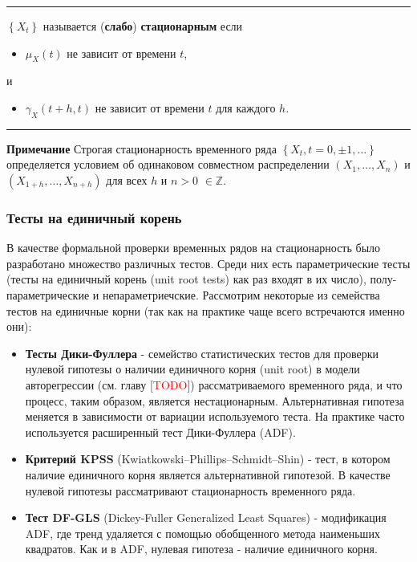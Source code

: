 \noindent\rule{\linewidth}{0.1mm}

\begin{definition}
    $\left\{ X_t \right\}$ называется (\textbf{слабо}) 
    \textbf{стационарным} если
    \begin{itemize}
        \item $\mu_X(t)$ не зависит от времени $t$,
    \end{itemize}
    \vspace{-10pt}
    и 
    \vspace{-10pt}
    \begin{itemize}
        \item $\gamma_X(t+h, t)$ не зависит от времени $t$ для каждого $h$.
    \end{itemize}
    \noindent\rule{\linewidth}{0.1mm}
\end{definition}

\noindent\textbf{Примечание} Строгая стационарность временного ряда $\left\{ 
X_t, t = 0, \pm 1, \dots \right\}$ определяется условием об одинаковом 
совместном распределении
$ \left( X_1, \dots, X_n \right) $ и $ \left( X_{1+h}, \dots, X_{n+h} \right) $ 
для всех $h$ и $n > 0$ $\in \mathbb{Z}$.

\subsubsection{Тесты на единичный корень}

В качестве формальной проверки временных рядов на стационарность было 
разработано множество различных тестов. Среди них есть 
параметрические тесты (тесты на единичный корень (unit root tests) как 
раз входят в их число), полу-параметрические и непараметриечские. 
Рассмотрим некоторые из семейства тестов на единичные корни (так как 
на практике чаще всего встречаются именно они):

\begin{itemize}
    \item \textbf{Тесты Дики-Фуллера} - семейство статистических тестов для проверки 
    нулевой гипотезы о наличии единичного корня (unit root) в модели авторегрессии 
    (см. главу [\textcolor{red}{TODO}]) рассматриваемого временного ряда, и что процесс, таким образом, 
    является нестационарным. Альтернативная гипотеза меняется в зависимости от 
    вариации используемого теста. На практике часто используется расширенный 
    тест Дики-Фуллера (ADF).

    \item \textbf{Критерий KPSS} (Kwiatkowski–Phillips–Schmidt–Shin) - тест, 
    в котором наличие единичного корня является альтернативной гипотезой. 
    В качестве нулевой гипотезы рассматривают стационарность временного ряда.
    
    \item  \textbf{Тест DF-GLS} (Dickey-Fuller Generalized Least Squares) - 
    модификация ADF, где тренд удаляется с помощью 
    обобщенного метода наименьших квадратов. Как и в ADF, 
    нулевая гипотеза - наличие единичного корня.
\end{itemize}

